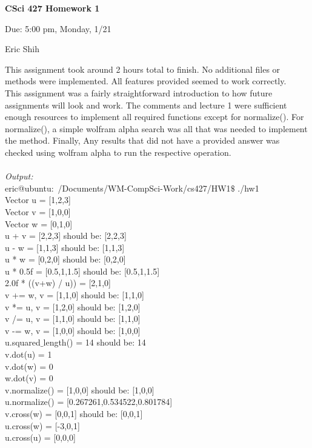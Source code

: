 \documentclass[11pt]{article}
\begin{document}
\begin{LARGE}
\centerline {\bf CSci 427 Homework 1}
\end{LARGE}
\vskip 0.25cm

\centerline{Due: 5:00 pm, Monday, 1/21}
\centerline{Eric Shih}

\setlength{\parindent}{1cm}
\indent This assignment took around 2 hours total to finish. No additional files or methods were implemented. All features provided seemed to work
correctly. \\
\indent This assignment was a fairly straightforward introduction to how future assignments will look and work. The comments and lecture 1
were sufficient enough resources to implement all required functions except for normalize(). For normalize(), a simple wolfram alpha search
was all that was needed to implement the method. Finally, Any results that did not have a provided answer was checked using wolfram alpha
to run the respective operation.
\\ \\
\textit{Output:} \\
eric@ubuntu:~/Documents/WM-CompSci-Work/cs427/HW1$\$$ ./hw1 \\
Vector u = [1,2,3] \\
Vector v = [1,0,0] \\
Vector w = [0,1,0] \\
u + v    = [2,2,3] should be: [2,2,3] \\
u - w    = [1,1,3] should be: [1,1,3] \\
u * w    = [0,2,0] should be: [0,2,0] \\
u * 0.5f = [0.5,1,1.5] should be: [0.5,1,1.5] \\
2.0f * ((v+w) / u)) = [2,1,0] \\
v += w,   v = [1,1,0] should be: [1,1,0] \\
v *= u,   v = [1,2,0] should be: [1,2,0] \\
v /= u,   v = [1,1,0] should be: [1,1,0] \\
v -= w,   v = [1,0,0] should be: [1,0,0] \\
u.squared$\_$length() = 14 should be: 14 \\
v.dot(u) = 1 \\
v.dot(w) = 0 \\
w.dot(v) = 0 \\
v.normalize() = [1,0,0] should be: [1,0,0] \\
u.normalize() = [0.267261,0.534522,0.801784] \\
v.cross(w) = [0,0,1] should be: [0,0,1] \\
u.cross(w) = [-3,0,1] \\
u.cross(u) = [0,0,0] \\
\end{document}
